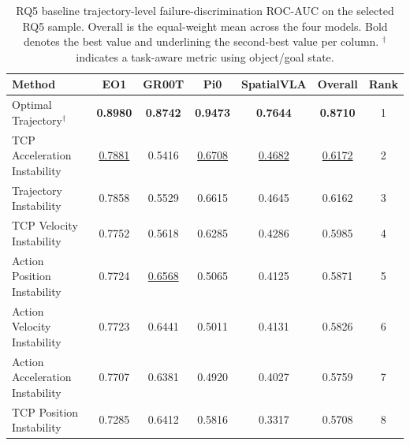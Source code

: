 \begin{table}[t]
\centering
\caption{RQ5 baseline trajectory-level failure-discrimination ROC-AUC on the selected RQ5 sample. Overall is the equal-weight mean across the four models. Bold denotes the best value and underlining the second-best value per column. $^{\dagger}$ indicates a task-aware metric using object/goal state.}
\label{tab:rq5-baseline-performance}
{\scriptsize
\setlength{\tabcolsep}{4pt}
\begin{tabular}{lcccccc}
\toprule
Method & EO1 & GR00T & Pi0 & SpatialVLA & Overall & Rank \\
\midrule
Optimal Trajectory$^{\dagger}$ & \textbf{0.8980} & \textbf{0.8742} & \textbf{0.9473} & \textbf{0.7644} & \textbf{0.8710} & 1 \\
TCP Acceleration Instability & \underline{0.7881} & 0.5416 & \underline{0.6708} & \underline{0.4682} & \underline{0.6172} & 2 \\
Trajectory Instability & 0.7858 & 0.5529 & 0.6615 & 0.4645 & 0.6162 & 3 \\
TCP Velocity Instability & 0.7752 & 0.5618 & 0.6285 & 0.4286 & 0.5985 & 4 \\
Action Position Instability & 0.7724 & \underline{0.6568} & 0.5065 & 0.4125 & 0.5871 & 5 \\
Action Velocity Instability & 0.7723 & 0.6441 & 0.5011 & 0.4131 & 0.5826 & 6 \\
Action Acceleration Instability & 0.7707 & 0.6381 & 0.4920 & 0.4027 & 0.5759 & 7 \\
TCP Position Instability & 0.7285 & 0.6412 & 0.5816 & 0.3317 & 0.5708 & 8 \\
\bottomrule
\end{tabular}
}
\end{table}

